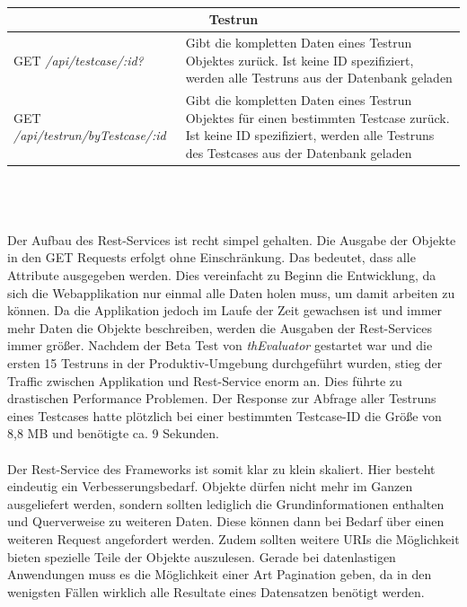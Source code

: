 \\
\\
\\
{\footnotesize
\begin{tabular}{ p{5.5cm} p{9cm} }
  \hline
  \multicolumn{2}{c}{\textbf{Testrun}} \\
  \hline
  GET \textit{/api/testcase/:id?} & Gibt die kompletten Daten eines Testrun Objektes zurück. Ist keine ID spezifiziert, werden alle Testruns aus der Datenbank geladen\vspace{0.2cm}\\
  GET \textit{/api/testrun/byTestcase/:id} & Gibt die kompletten Daten eines Testrun Objektes für einen bestimmten Testcase zurück. Ist keine ID spezifiziert, werden alle Testruns des Testcases aus der Datenbank geladen\vspace{0.2cm}\\

  \hline
\end{tabular}
}
\\
\\
\\
Der Aufbau des Rest-Services ist recht simpel gehalten. Die Ausgabe der Objekte in den GET Requests erfolgt ohne Einschränkung. Das bedeutet, dass alle Attribute ausgegeben werden. Dies vereinfacht zu Beginn die Entwicklung, da sich die Webapplikation nur einmal alle Daten holen muss, um damit arbeiten zu können. Da die Applikation jedoch im Laufe der Zeit gewachsen ist und immer mehr Daten die Objekte beschreiben, werden die Ausgaben der Rest-Services immer größer. Nachdem der Beta Test von \textit{thEvaluator} gestartet war und die ersten 15 Testruns in der Produktiv-Umgebung durchgeführt wurden, stieg der Traffic zwischen Applikation und Rest-Service enorm an. Dies führte zu drastischen Performance Problemen. Der Response zur Abfrage aller Testruns eines Testcases hatte plötzlich bei einer bestimmten Testcase-ID die Größe von 8,8 MB und benötigte ca. 9 Sekunden.\\
\\
Der Rest-Service des Frameworks ist somit klar zu klein skaliert. Hier besteht eindeutig ein Verbesserungsbedarf. Objekte dürfen nicht mehr im Ganzen ausgeliefert werden, sondern sollten lediglich die Grundinformationen enthalten und Querverweise zu weiteren Daten. Diese können dann bei Bedarf über einen weiteren Request angefordert werden. Zudem sollten weitere \Gls{URI}s die Möglichkeit bieten spezielle Teile der Objekte auszulesen. Gerade bei datenlastigen Anwendungen muss es die Möglichkeit einer Art Pagination geben, da in den wenigsten Fällen wirklich alle Resultate eines Datensatzen benötigt werden.


